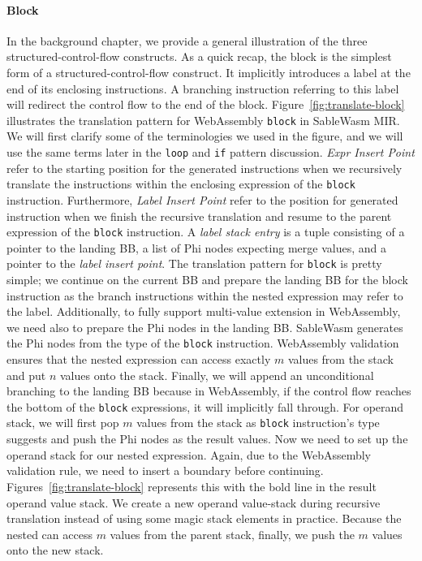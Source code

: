 \paragraph{Block} In the background chapter, we provide a general illustration of the three structured-control-flow constructs.  As a quick recap, the block is the simplest form of a structured-control-flow construct. It implicitly introduces a label at the end of its enclosing instructions. A branching instruction referring to this label will redirect the control flow to the end of the block. Figure~\ref{fig:translate-block} illustrates the translation pattern for WebAssembly \texttt{block} in SableWasm MIR.  We will first clarify some of the terminologies we used in the figure, and we will use the same terms later in the \texttt{loop} and \texttt{if} pattern discussion. \emph{Expr Insert Point} refer to the starting position for the generated instructions when we recursively translate the instructions within the enclosing expression of the \texttt{block} instruction. Furthermore, \emph{Label Insert Point} refer to the position for generated instruction when we finish the recursive translation and resume to the parent expression of the \texttt{block} instruction. A \emph{label stack entry} is a tuple consisting of a pointer to the landing BB, a list of Phi nodes expecting merge values, and a pointer to the \emph{label insert point}. The translation pattern for \texttt{block} is pretty simple; we continue on the current BB and prepare the landing BB for the block instruction as the branch instructions within the nested expression may refer to the label. Additionally, to fully support multi-value extension in WebAssembly, we need also to prepare the Phi nodes in the landing BB. SableWasm generates the Phi nodes from the type of the \texttt{block} instruction. WebAssembly validation ensures that the nested expression can access exactly $m$ values from the stack and put $n$ values onto the stack. Finally, we will append an unconditional branching to the landing BB because in WebAssembly, if the control flow reaches the bottom of the \texttt{block} expressions, it will implicitly fall through. For operand stack, we will first pop $m$ values from the stack as \texttt{block} instruction's type suggests and push the Phi nodes as the result values. Now we need to set up the operand stack for our nested expression. Again, due to the WebAssembly validation rule, we need to insert a boundary before continuing. Figures~\ref{fig:translate-block} represents this with the bold line in the result operand value stack. We create a new operand value-stack during recursive translation instead of using some magic stack elements in practice.  Because the nested can access $m$ values from the parent stack, finally, we push the $m$ values onto the new stack. 


